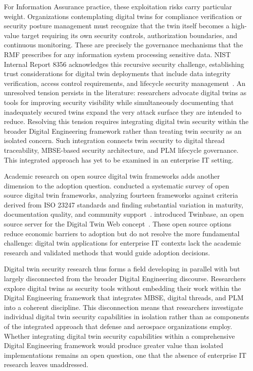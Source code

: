 For Information Assurance practice, these exploitation risks carry particular weight. Organizations contemplating digital twins for compliance verification or security posture management must recognize that the twin itself becomes a high-value target requiring its own security controls, authorization boundaries, and continuous monitoring. These are precisely the governance mechanisms that the RMF prescribes for any information system processing sensitive data. NIST Internal Report 8356 acknowledges this recursive security challenge, establishing trust considerations for digital twin deployments that include data integrity verification, access control requirements, and lifecycle security management~\parencite{NIST_IR_8356_2025}. An unresolved tension persists in the literature: researchers advocate digital twins as tools for improving security visibility while simultaneously documenting that inadequately secured twins expand the very attack surface they are intended to reduce. Resolving this tension requires integrating digital twin security within the broader Digital Engineering framework rather than treating twin security as an isolated concern. Such integration connects twin security to digital thread traceability, MBSE-based security architecture, and PLM lifecycle governance. This integrated approach has yet to be examined in an enterprise IT setting.

Academic research on open source digital twin frameworks adds another dimension to the adoption question. \citeauthor{Gil_2024} conducted a systematic survey of open source digital twin frameworks, analyzing fourteen frameworks against criteria derived from ISO 23247 standards and finding substantial variation in maturity, documentation quality, and community support~\parencite{Gil_2024}. \citeauthor{Autiosalo_Siegel_Tammi_2021} introduced Twinbase, an open source server for the Digital Twin Web concept~\parencite{Autiosalo_Siegel_Tammi_2021}. These open source options reduce economic barriers to adoption but do not resolve the more fundamental challenge: digital twin applications for enterprise IT contexts lack the academic research and validated methods that would guide adoption decisions.

Digital twin security research thus forms a field developing in parallel with but largely disconnected from the broader Digital Engineering discourse. Researchers explore digital twins as security tools without embedding their work within the Digital Engineering framework that integrates MBSE, digital threads, and PLM into a coherent discipline. This disconnection means that researchers investigate individual digital twin security capabilities in isolation rather than as components of the integrated approach that defense and aerospace organizations employ. Whether integrating digital twin security capabilities within a comprehensive Digital Engineering framework would produce greater value than isolated implementations remains an open question, one that the absence of enterprise IT research leaves unaddressed.

